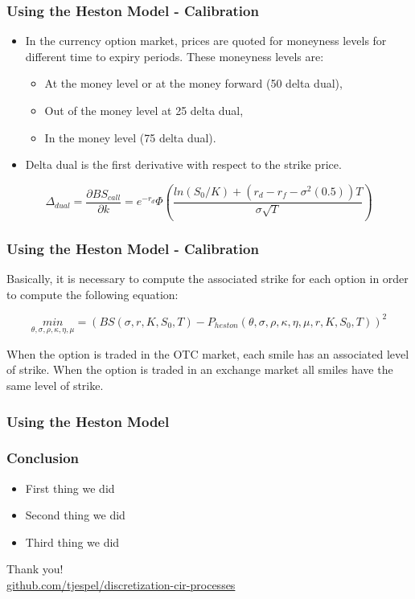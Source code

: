 \documentclass[12pt]{beamer}
\begin{document}
\begin{frame}
\frametitle{Using the Heston Model - Calibration}
\begin{itemize}
  \item In the currency option market, prices are quoted for moneyness levels for different time to expiry periods. These moneyness levels are:
  \begin{itemize}
    \item At the money level or at the money forward (50 delta dual),
    \item Out of the money level at 25 delta dual,
    \item In the money level (75 delta dual).
  \end{itemize}
  \item Delta dual is the first derivative with respect to the strike price.
\end{itemize}
$$\Delta_{dual}=\frac{\partial BS_{call}}{\partial k}=e^{-r_{d}}\Phi \left(\frac{ln(S_{0}/K)+(r_{d}-r_{f}-\sigma^{2}(0.5))T}{\sigma \sqrt T}\right)$$
\end{frame}


\begin{frame}
\frametitle{Using the Heston Model - Calibration}
Basically, it is necessary to compute the associated strike for each option in order to compute the following equation:

$$\underset{\theta,\sigma,\rho,\kappa,\eta,\mu}{min}=(BS(\sigma,r,K,S_{0},T)-P_{heston}(\theta,\sigma,\rho,\kappa,\eta,\mu,r,K,S_{0},T))^2$$

When the option is traded in the OTC market, each smile has an associated level of strike. When the option is traded in an exchange market all smiles have the same level of strike.
\end{frame}

\begin{frame}
\frametitle{Using the Heston Model}
\end{frame}




\begin{frame}
\frametitle{Conclusion}
\begin{itemize}
  \item First thing we did
  \item Second thing we did
  \item Third thing we did
\end{itemize}
\end{frame}


\begin{frame}
\centering
{\Large Thank you!}
\\[1cm]
{\small\url{github.com/tjespel/discretization-cir-processes}}
\end{frame}
\end{document}
